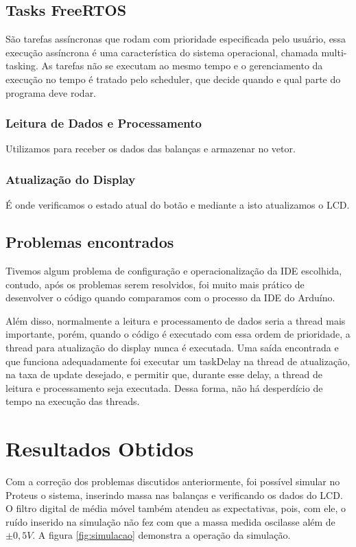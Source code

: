 \documentclass[a4paper, 12pt]{article}
\begin{document}
	\subsection{Tasks FreeRTOS}
	São tarefas assíncronas que rodam com prioridade especificada pelo usuário, essa execução assíncrona é uma característica do sistema operacional, chamada multi-tasking. As tarefas não se executam ao mesmo tempo e o gerenciamento da execução no tempo é tratado pelo scheduler, que decide quando e qual parte do programa deve rodar.
	
	\subsubsection{Leitura de Dados e Processamento}
	Utilizamos para receber os dados das balanças e armazenar no vetor.
	
	\subsubsection{Atualização do Display}
	É onde verificamos o estado atual do botão e mediante a isto atualizamos o LCD.
	
	\subsection{Problemas encontrados}
	\label{poblemas}
	Tivemos algum problema de configuração e operacionalização da IDE escolhida, contudo, após os problemas serem resolvidos, foi muito mais prático de desenvolver o código quando comparamos com o processo da IDE do Arduíno. 

	Além disso, normalmente a leitura e processamento de dados seria a thread mais importante, porém, quando o código é executado com essa ordem de prioridade, a thread para atualização do display nunca é executada. Uma saída encontrada e que funciona adequadamente foi executar um taskDelay na thread de atualização, na taxa de update desejado, e permitir que, durante esse delay, a thread de leitura e processamento seja executada. Dessa forma, não há desperdício de tempo na execução das threads.  
	
	
	\section{Resultados Obtidos}
	Com a correção dos problemas discutidos anteriormente, foi possível simular no Proteus o sistema, inserindo massa nas balanças e verificando os dados do LCD. O filtro digital de média móvel também atendeu as expectativas, pois, com ele, o ruído inserido na simulação não fez com que a massa medida oscilasse além de $ \pm 0,5V $. A figura \ref{fig:simulacao} demonstra a operação da simulação.
	
\end{document}
